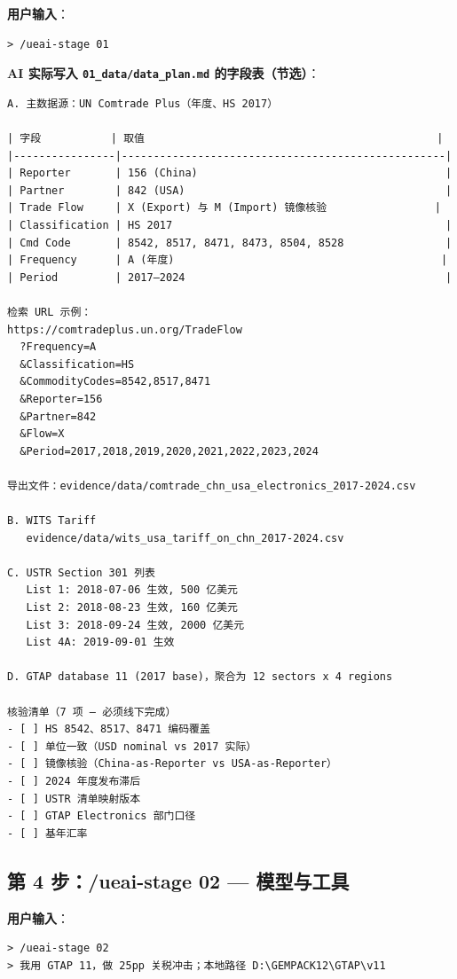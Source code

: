 \documentclass[12pt,a4paper]{article}
\begin{document}
\noindent\textbf{用户输入}：
\begin{lstlisting}[style=prompt]
> /ueai-stage 01
\end{lstlisting}

\noindent\textbf{AI 实际写入 \texttt{01\_data/data\_plan.md} 的字段表（节选）}：
\begin{lstlisting}[style=md]
A. 主数据源：UN Comtrade Plus（年度、HS 2017）

| 字段           | 取值                                              |
|----------------|---------------------------------------------------|
| Reporter       | 156 (China)                                       |
| Partner        | 842 (USA)                                         |
| Trade Flow     | X (Export) 与 M (Import) 镜像核验                 |
| Classification | HS 2017                                           |
| Cmd Code       | 8542, 8517, 8471, 8473, 8504, 8528                |
| Frequency      | A (年度)                                          |
| Period         | 2017–2024                                         |

检索 URL 示例：
https://comtradeplus.un.org/TradeFlow
  ?Frequency=A
  &Classification=HS
  &CommodityCodes=8542,8517,8471
  &Reporter=156
  &Partner=842
  &Flow=X
  &Period=2017,2018,2019,2020,2021,2022,2023,2024

导出文件：evidence/data/comtrade_chn_usa_electronics_2017-2024.csv

B. WITS Tariff
   evidence/data/wits_usa_tariff_on_chn_2017-2024.csv

C. USTR Section 301 列表
   List 1: 2018-07-06 生效, 500 亿美元
   List 2: 2018-08-23 生效, 160 亿美元
   List 3: 2018-09-24 生效, 2000 亿美元
   List 4A: 2019-09-01 生效

D. GTAP database 11 (2017 base)，聚合为 12 sectors x 4 regions

核验清单（7 项 — 必须线下完成）
- [ ] HS 8542、8517、8471 编码覆盖
- [ ] 单位一致（USD nominal vs 2017 实际）
- [ ] 镜像核验（China-as-Reporter vs USA-as-Reporter）
- [ ] 2024 年度发布滞后
- [ ] USTR 清单映射版本
- [ ] GTAP Electronics 部门口径
- [ ] 基年汇率
\end{lstlisting}

\subsection{第 4 步：/ueai-stage 02 — 模型与工具}

\noindent\textbf{用户输入}：
\begin{lstlisting}[style=prompt]
> /ueai-stage 02
> 我用 GTAP 11，做 25pp 关税冲击；本地路径 D:\GEMPACK12\GTAP\v11
\end{lstlisting}
\end{document}
